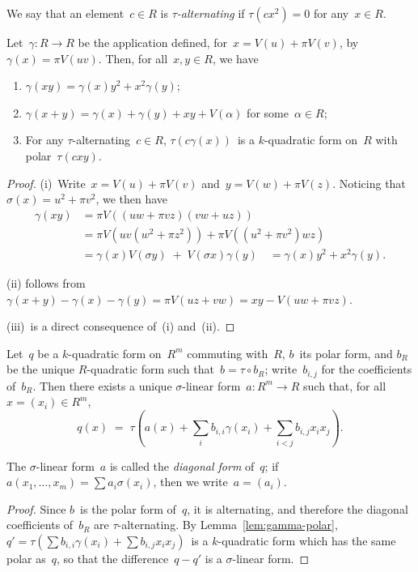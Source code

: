 \documentclass{amsart}
\def\pa#1{\left(#1\right)}
\begin{document}
We say that an element~$c ∈ R$
is \emph{$τ$-alternating} if $τ(c x^2) = 0$ for any~$x ∈ R$.

\begin{lem}\label{lem:gamma-polar}
Let~$γ: R → R$ be the application defined, for~$x = V(u) + π V(v)$,
by~$γ(x) = π V(u v)$. Then, for all~$x,y ∈ R$, we have
\begin{enumerate}
\item $γ(x y) = γ(x) y^2 + x^2 γ(y)$;
\item $γ(x+y) = γ(x) + γ(y) + x y + V(α)$ for some~$α ∈ R$;
\item For any $τ$-alternating~$c ∈ R$,
$τ(c γ (x))$~is a $k$-quadratic form on~$R$ with polar~$τ(c x y)$.
\end{enumerate}
\end{lem}
\begin{proof}
(i)~Write~$x = V(u) + π V(v)$ and~$y = V(w) + π V(z)$. Noticing
that~$σ(x) = u^2 + π v^2$, we then have
\begin{equation}\label{eq:gamma-prod}
\begin{split}
γ(x y) &= π V\pa{(uw + π vz)(vw+uz)}\\
 &= π V\pa{u v (w^2 + π z^2)} + π V \pa{(u^2+π v^2) wz}\\
 &= γ(x) V(σ y) \;+\; V( σx) γ(y) \quad = γ(x) y^2 + x^2 γ(y).
\end{split}
\end{equation}

(ii) follows from
$γ(x+y) - γ(x) - γ(y) = π V(uz + vw) = xy - V(uw+πvz)$.

(iii)~is a direct consequence of~(i) and~(ii).
\end{proof}
\begin{prop}\label{prop:quad-tau}
Let~$q$ be a $k$-quadratic form on~$R^m$ commuting with~$R$,
$b$~its polar form, and $b_R$ be the unique $R$-quadratic form
such that~$b = τ ∘ b_R$;
write~$b_{i,j}$ for the coefficients of~$b_R$.
Then there exists a unique $σ$-linear form~$a: R^m → R$ such that,
for all~$x = (x_i) ∈ R^m$,
\begin{equation}
q(x) \;=\; τ\pa{a(x) + ∑_{i} b_{i,i} γ(x_i) + ∑_{i < j} b_{i,j} x_i x_j}.
\end{equation}
\end{prop}
The $σ$-linear form~$a$ is called the \emph{diagonal form} of~$q$;
if $a(x_1, …,x_m)=∑ a_i σ(x_i)$, then we write~$a=(a_i)$.
\begin{proof}
Since $b$~is the polar form of~$q$, it is alternating,
and therefore the diagonal coefficients of~$b_R$ are $τ$-alternating.
By Lemma~\ref{lem:gamma-polar},
$q' = τ(∑ b_{i,i} γ(x_i) + ∑ b_{i,j} x_i x_j)$~is a $k$-quadratic form
which has the same polar as~$q$,
so that the difference~$q - q'$ is a $σ$-linear form.
\end{proof}
\end{document}
